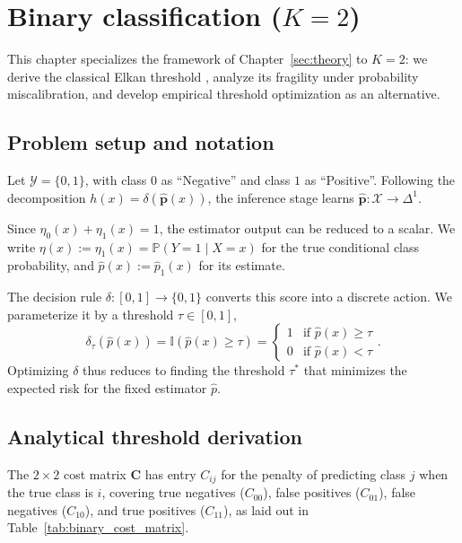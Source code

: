 \chapter{Binary classification ($K=2$)}\label{sec:binary}

This chapter specializes the framework of Chapter~\ref{sec:theory} to $K=2$: we derive the classical Elkan threshold \citep{elkan2001foundations}, analyze its fragility under probability miscalibration, and develop empirical threshold optimization as an alternative.

\section{Problem setup and notation}\label{sec:binary_setup}

Let $\mathcal{Y} = \{0, 1\}$, with class $0$ as ``Negative'' and class $1$ as ``Positive''. Following the decomposition $h(x) = \delta(\hat{\mathbf{p}}(x))$, the inference stage learns $\hat{\mathbf{p}}: \mathcal{X} \to \Delta^1$.

Since $\eta_0(x) + \eta_1(x) = 1$, the estimator output can be reduced to a scalar. We write $\eta(x) := \eta_1(x) = \mathbb{P}(Y{=}1 \mid X{=}x)$ for the true conditional class probability, and $\hat{p}(x) := \hat{p}_1(x)$ for its estimate.

The decision rule $\delta: [0, 1] \to \{0, 1\}$ converts this score into a discrete action. We parameterize it by a threshold $\tau \in [0, 1]$,
\begin{equation}\label{eq:threshold_rule}
    \delta_\tau(\hat{p}(x)) = \mathbb{I}(\hat{p}(x) \geq \tau) = \begin{cases}
        1 & \text{if } \hat{p}(x) \geq \tau \\
        0 & \text{if } \hat{p}(x) < \tau
    \end{cases}.
\end{equation}
Optimizing $\delta$ thus reduces to finding the threshold $\tau^*$ that minimizes the expected risk for the fixed estimator $\hat{p}$.

\section{Analytical threshold derivation}\label{sec:analytical_threshold}

The $2 \times 2$ cost matrix $\mathbf{C}$ has entry $C_{ij}$ for the penalty of predicting class $j$ when the true class is $i$, covering true negatives ($C_{00}$), false positives ($C_{01}$), false negatives ($C_{10}$), and true positives ($C_{11}$), as laid out in Table~\ref{tab:binary_cost_matrix}.

